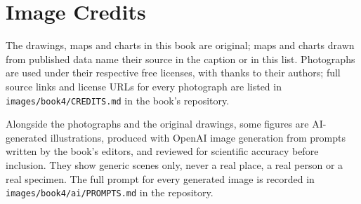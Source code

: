 \chapter*{Image Credits}

The drawings, maps and charts in this book are original; maps and charts
drawn from published data name their source in the caption or in this
list. Photographs are used under their respective free licenses, with
thanks to their authors; full source links and license URLs for every
photograph are listed in \texttt{images/book4/CREDITS.md} in the book's
repository.

\bigskip
Alongside the photographs and the original drawings, some figures are
AI-generated illustrations, produced with OpenAI image generation from
prompts written by the book's editors, and reviewed for scientific
accuracy before inclusion. They show generic scenes only, never a real
place, a real person or a real specimen. The full prompt for every
generated image is recorded in \texttt{images/book4/ai/PROMPTS.md} in the
repository.

